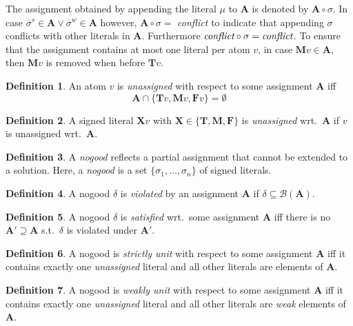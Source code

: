 \documentclass{vutinfth} %
\theoremstyle{example}
\theoremstyle{definition}
\newtheorem{definition}{Definition}[section]
\theoremstyle{theorem}
\theoremstyle{lemma}
\theoremstyle{corollary}
\newcommand{\negstrong}[1]{\overline{#1}^s}
\newcommand{\negweak}[1]{\overline{#1}^w}
\newcommand{\bass}{\mathcal{B}}
\newcommand{\ass}{\mathbf{A}}
\newcommand{\bT}{\mathbf{T}}
\newcommand{\bM}{\mathbf{M}}
\newcommand{\bF}{\mathbf{F}}
\newcommand{\bX}{\mathbf{X}}
\newcommand{\sgl}{\mu}
\newcommand{\bsgl}{\sigma}
\newcommand{\thrice}{{\{\bT, \bM, \bF \}}}
\begin{document}
The assignment obtained by appending the literal $\sgl$ to $\ass$ is denoted by $\ass \circ \sigma$. In case $\negstrong{\sigma} \in \ass \vee \negweak{\sigma} \in \ass$ however, $\ass \circ \sigma =$ \emph{conflict} to indicate that appending $\sigma$ conflicts with other literals in $\ass$. Furthermore $\emph{conflict} \circ \sigma = \emph{conflict}$. To ensure that the assignment contains at most one literal per atom $v$, in case $\bM v \in \ass$, then $\bM v$ is removed when before $\bT v$.

\begin{definition}
An atom $v$ is \emph{unassigned} with respect to some assignment $\ass$ iff $$\ass \cap \{\bT v, \bM v, \bF v \} = \emptyset$$
\end{definition}

\begin{definition}
A signed literal $\bX v$ with $\bX \in \thrice$ is \emph{unassigned} wrt.~$\ass$ if $v$ is unassigned wrt.~$\ass$.
\end{definition}

\begin{definition}
A \emph{nogood} reflects a partial assignment that cannot be extended to a solution. Here, a \emph{nogood} is a set $\{ \bsgl_1, \ldots, \bsgl_n \}$ of signed literals.
\end{definition}

\begin{definition}
A nogood $\delta$ is \emph{violated} by an assignment $\ass$ if $\delta \subseteq \bass(\ass)$.
\end{definition}

\begin{definition}
A nogood $\delta$ is \emph{satisfied} wrt.~some assignment $\ass$ iff there is no $\ass' \supseteq \ass$ s.t.~$\delta$ is violated under $\ass'$.
\end{definition}

\begin{definition}
A nogood is \emph{strictly unit} with respect to some assignment $\ass$ iff it contains exactly one \emph{unassigned} literal and all other literals are elements of $\ass$.
\end{definition}

\begin{definition}
A nogood is \emph{weakly unit} with respect to some assignment $\ass$ iff it contains exactly one \emph{unassigned} literal and all other literals are \emph{weak} elements of $\ass$.
\end{definition}
\end{document}

